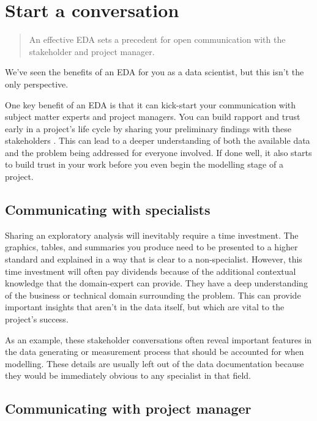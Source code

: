 \documentclass[
  letterpaper,
  DIV=11,
  numbers=noendperiod]{scrreprt}
\begin{document}
\section{Start a conversation}\label{start-a-conversation}

\begin{quote}
An effective EDA sets a precedent for open communication with the
stakeholder and project manager.
\end{quote}

We've seen the benefits of an EDA for you as a data scientist, but this
isn't the only perspective.

One key benefit of an EDA is that it can kick-start your communication
with subject matter experts and project managers. You can build rapport
and trust early in a project's life cycle by sharing your preliminary
findings with these stakeholders . This can lead to a deeper
understanding of both the available data and the problem being addressed
for everyone involved. If done well, it also starts to build trust in
your work before you even begin the modelling stage of a project.

\subsection{Communicating with
specialists}\label{communicating-with-specialists}

Sharing an exploratory analysis will inevitably require a time
investment. The graphics, tables, and summaries you produce need to be
presented to a higher standard and explained in a way that is clear to a
non-specialist. However, this time investment will often pay dividends
because of the additional contextual knowledge that the domain-expert
can provide. They have a deep understanding of the business or technical
domain surrounding the problem. This can provide important insights that
aren't in the data itself, but which are vital to the project's success.

As an example, these stakeholder conversations often reveal important
features in the data generating or measurement process that should be
accounted for when modelling. These details are usually left out of the
data documentation because they would be immediately obvious to any
specialist in that field.

\subsection{Communicating with project
manager}\label{communicating-with-project-manager}
\end{document}
